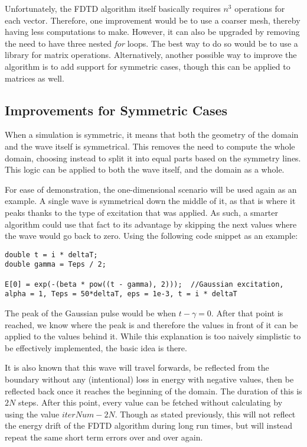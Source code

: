 Unfortunately, the FDTD algorithm itself basically requires $n^3$ operations for each vector. Therefore, one improvement would be to use a coarser mesh, thereby having less computations to make. However, it can also be upgraded by removing the need to have three nested \textit{for} loops. The best way to do so would be to use a library for matrix operations. Alternatively, another possible way to improve the algorithm is to add support for symmetric cases, though this can be applied to matrices as well.

\subsection{Improvements for Symmetric Cases}

When a simulation is symmetric, it means that both the geometry of the domain and the wave itself is symmetrical. This removes the need to compute the whole domain, choosing instead to split it into equal parts based on the symmetry lines. This logic can be applied to both the wave itself, and the domain as a whole.

For ease of demonstration, the one-dimensional scenario will be used again as an example. A single wave is symmetrical down the middle of it, as that is where it peaks thanks to the type of excitation that was applied. As such, a smarter algorithm could use that fact to its advantage by skipping the next values where the wave would go back to zero. Using the following code snippet as an example:

\clearpage

\begin{verbatim}
double t = i * deltaT;
double gamma = Teps / 2;

E[0] = exp(-(beta * pow((t - gamma), 2)));  //Gaussian excitation, alpha = 1, Teps = 50*deltaT, eps = 1e-3, t = i * deltaT
\end{verbatim}

The peak of the Gaussian pulse would be when $t - \gamma = 0$. After that point is reached, we know where the peak is and therefore the values in front of it can be applied to the values behind it. While this explanation is too naively simplistic to be effectively implemented, the basic idea is there.

It is also known that this wave will travel forwards, be reflected from the boundary without any (intentional) loss in energy with negative values, then be reflected back once it reaches the beginning of the domain. The duration of this is $2N$ steps. After this point, every value can be fetched without calculating by using the value ${iterNum} - 2N$. Though as stated previously, this will not reflect the energy drift of the FDTD algorithm during long run times, but will instead repeat the same short term errors over and over again.

